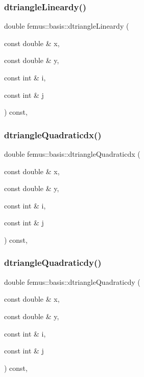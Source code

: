 \subsubsection{\texorpdfstring{dtriangle\+Lineardy()}{dtriangleLineardy()}}
{\footnotesize\ttfamily double femus\+::basis\+::dtriangle\+Lineardy (\begin{DoxyParamCaption}\item[{const double \&}]{x,  }\item[{const double \&}]{y,  }\item[{const int \&}]{i,  }\item[{const int \&}]{j }\end{DoxyParamCaption}) const\hspace{0.3cm}{\ttfamily [inline]}, {\ttfamily [protected]}}

\mbox{\label{classfemus_1_1basis_a36ac5b9e572289fb4d552b97dec8a0f1}} 
\subsubsection{\texorpdfstring{dtriangle\+Quadraticdx()}{dtriangleQuadraticdx()}}
{\footnotesize\ttfamily double femus\+::basis\+::dtriangle\+Quadraticdx (\begin{DoxyParamCaption}\item[{const double \&}]{x,  }\item[{const double \&}]{y,  }\item[{const int \&}]{i,  }\item[{const int \&}]{j }\end{DoxyParamCaption}) const\hspace{0.3cm}{\ttfamily [inline]}, {\ttfamily [protected]}}

\mbox{\label{classfemus_1_1basis_aa6d822471f1a03034003e0499ca6a2c6}} 
\subsubsection{\texorpdfstring{dtriangle\+Quadraticdy()}{dtriangleQuadraticdy()}}
{\footnotesize\ttfamily double femus\+::basis\+::dtriangle\+Quadraticdy (\begin{DoxyParamCaption}\item[{const double \&}]{x,  }\item[{const double \&}]{y,  }\item[{const int \&}]{i,  }\item[{const int \&}]{j }\end{DoxyParamCaption}) const\hspace{0.3cm}{\ttfamily [inline]}, {\ttfamily [protected]}}

